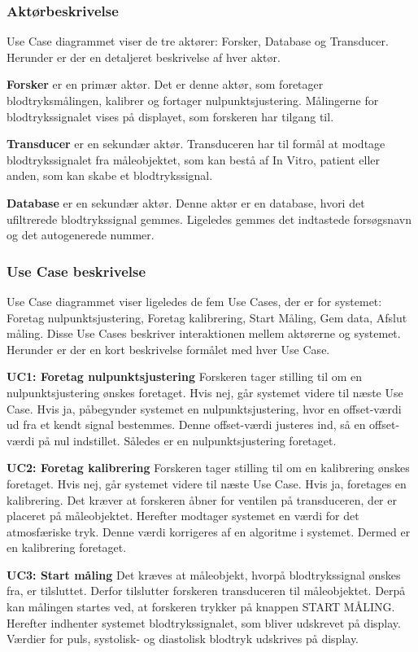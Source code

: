\subsubsection{Aktørbeskrivelse}
Use Case diagrammet viser de tre aktører: Forsker, Database og Transducer. Herunder er der en detaljeret beskrivelse af hver aktør.

\textbf{Forsker} er en primær aktør. Det er denne aktør, som foretager blodtryksmålingen, kalibrer og fortager nulpunktsjustering. Målingerne for blodtrykssignalet vises på displayet, som forskeren har tilgang til. 

\textbf{Transducer} er en sekundær aktør. Transduceren har til formål at modtage blodtrykssignalet fra måleobjektet, som kan bestå af In Vitro, patient eller anden, som kan skabe et blodtrykssignal. 

\textbf{Database} er en sekundær aktør. Denne aktør er en database, hvori det ufiltrerede blodtrykssignal gemmes. Ligeledes gemmes det indtastede forsøgsnavn og det autogenerede nummer.

\subsubsection{Use Case beskrivelse}
Use Case diagrammet viser ligeledes de fem Use Cases, der er for systemet: Foretag nulpunktsjustering, Foretag kalibrering, Start Måling, Gem data, Afslut måling. Disse Use Cases beskriver interaktionen mellem aktørerne og systemet. Herunder er der en kort beskrivelse formålet med hver Use Case.

\textbf{UC1: Foretag nulpunktsjustering}
Forskeren tager stilling til om en nulpunktsjustering ønskes foretaget. Hvis nej, går systemet videre til næste Use Case. Hvis ja, påbegynder systemet en nulpunktsjustering, hvor en offset-værdi ud fra et kendt signal bestemmes. Denne offset-værdi justeres ind, så en offset-værdi på nul indstillet. Således er en nulpunktsjustering foretaget.

\textbf{UC2: Foretag kalibrering}
Forskeren tager stilling til om en kalibrering ønskes foretaget. Hvis nej, går systemet videre til næste Use Case. Hvis ja, foretages en kalibrering. Det kræver at forskeren åbner for ventilen på transduceren, der er placeret på måleobjektet. Herefter modtager systemet en værdi for det atmosfæriske tryk. Denne værdi korrigeres af en algoritme i systemet. Dermed er en kalibrering foretaget.  

\textbf{UC3: Start måling}
Det kræves at måleobjekt, hvorpå blodtrykssignal ønskes fra, er tilsluttet. Derfor tilslutter forskeren transduceren til måleobjektet. Derpå kan målingen startes ved, at forskeren trykker på knappen START MÅLING. Herefter indhenter systemet blodtrykssignalet, som bliver udskrevet på display. Værdier for puls, systolisk- og diastolisk blodtryk udskrives på display. 

